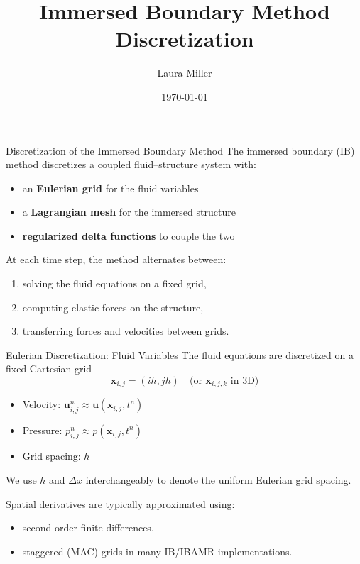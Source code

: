 \documentclass{beamer}
\title{Immersed Boundary Method Discretization}
\author{Laura Miller}
\date{\today}
\begin{document}
\frame{\titlepage}


\begin{frame}{Discretization of the Immersed Boundary Method}
\small
The immersed boundary (IB) method discretizes a coupled
fluid–structure system with:
\begin{itemize}
    \item an \textbf{Eulerian grid} for the fluid variables
    \item a \textbf{Lagrangian mesh} for the immersed structure
    \item \textbf{regularized delta functions} to couple the two
\end{itemize}

\medskip
At each time step, the method alternates between:
\begin{enumerate}
    \item solving the fluid equations on a fixed grid,
    \item computing elastic forces on the structure,
    \item transferring forces and velocities between grids.
\end{enumerate}
\end{frame}

\begin{frame}{Eulerian Discretization: Fluid Variables}
\small
The fluid equations are discretized on a fixed Cartesian grid
\[
\mathbf{x}_{i,j} = (i h, j h)
\quad \text{(or } \mathbf{x}_{i,j,k} \text{ in 3D)}
\]


\medskip
\begin{itemize}
    \item Velocity: $\mathbf{u}_{i,j}^n \approx \mathbf{u}(\mathbf{x}_{i,j}, t^n)$
    \item Pressure: $p_{i,j}^n \approx p(\mathbf{x}_{i,j}, t^n)$
    \item Grid spacing: $h$
\end{itemize}

\medskip
We use $h$ and $\Delta x$ interchangeably to denote the uniform Eulerian grid spacing.

\medskip
Spatial derivatives are typically approximated using:
\begin{itemize}
    \item second-order finite differences,
    \item staggered (MAC) grids in many IB/IBAMR implementations.
\end{itemize}
\end{frame}
\end{document}
